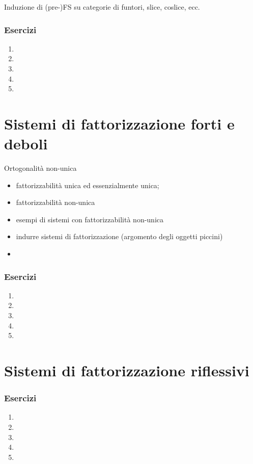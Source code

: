 \begin{example}
	Induzione di (pre-)FS su categorie di funtori, slice, coslice, ecc.
\end{example}

\subsubsection*{Esercizi}
\begin{enumerate}
	\item
	\item
	\item
	\item
	\item
\end{enumerate}
\section[Fattorizzazione]{Sistemi di fattorizzazione forti e deboli}
Ortogonalità non-unica
\begin{itemize}
	\item fattorizzabilità unica ed essenzialmente unica;
	\item fattorizzabilità non-unica
	\item esempi di sistemi con fattorizzabilità non-unica
	\item indurre sistemi di fattorizzazione (argomento degli oggetti piccini)
	\item
\end{itemize}
\subsubsection*{Esercizi}
\begin{enumerate}
	\item
	\item
	\item
	\item
	\item
\end{enumerate}
\section[Riflessività]{Sistemi di fattorizzazione riflessivi}
\subsubsection*{Esercizi}
\begin{enumerate}
	\item
	\item
	\item
	\item
	\item
\end{enumerate}

